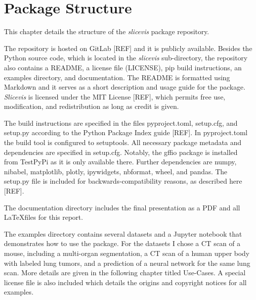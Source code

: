 \chapter{Package Structure}
This chapter details the structure of the \emph{slicevis} package repository. 

The repository is hosted on GitLab [REF] and it is publicly available. Besides the Python source code, which is located in the \emph{slicevis} sub-directory, the repository also contains a README, a license file (LICENSE), pip build instructions, an examples directory, and documentation. The README is formatted using Markdown and it serves as a short description and usage guide for the package. \emph{Slicevis} is licensed under the MIT License [REF], which permits free use, modification, and redistribution as long as credit is given. 

The build instructions are specified in the files pyproject.toml, setup.cfg, and setup.py according to the Python Package Index guide [REF]. In pyproject.toml the build tool is configured to setuptools. All necessary package metadata and dependencies are specified in setup.cfg. Notably, the gffio package is installed from TestPyPi as it is only available there. Further dependencies are numpy, nibabel, matplotlib, plotly, ipywidgets, nbformat, wheel, and pandas. The setup.py file is included for backwards-compatibility reasons, as described here [REF].

The documentation directory includes the final presentation as a PDF and all \LaTeX files for this report.

The examples directory contains several datasets and a Jupyter notebook that demonstrates how to use the package. For the datasets I chose a CT scan of a mouse, including a multi-organ segmentation, a CT scan of a human upper body with labeled lung tumors, and a prediction of a neural network for the same lung scan. More details are given in the following chapter titled Use-Cases. A special license file is also included which details the origins and copyright notices for all examples.